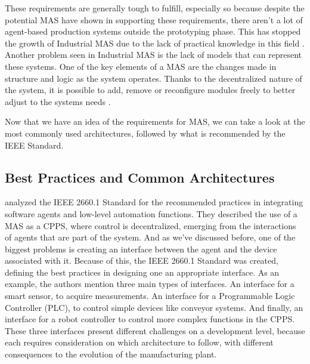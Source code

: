 These requirements are generally tough to fulfill, especially so because despite the potential MAS have shown in supporting these requirements, there aren't a lot of agent-based production systems outside the prototyping phase. This has stopped the growth of Industrial MAS due to the lack of practical knowledge in this field \cite{Karnouskos2019}. Another problem seen in Industrial MAS is the lack of models that can represent these systems. One of the key elements of a MAS are the changes made in structure and logic as the system operates. Thanks to the decentralized nature of the system, it is possible to add, remove or reconfigure modules freely to better adjust to the systems needs \cite{Karnouskos2019}.

Now that we have an idea of the requirements for MAS, we can take a look at the most commonly used architectures, followed by what is recommended by the IEEE Standard.

\subsection{Best Practices and Common Architectures}

\citeauthor{Leitao2021} \cite{Leitao2021} analyzed the IEEE 2660.1 Standard for the recommended practices in integrating software agents and low-level automation functions. They described the use of a MAS as a CPPS, where control is decentralized, emerging from the interactions of agents that are part of the system. And as we've discussed before, one of the biggest problems is creating an interface between the agent and the device associated with it. Because of this, the IEEE 2660.1 Standard was created, defining the best practices in designing one an appropriate interface.
As an example, the authors mention three main types of interfaces. An interface for a smart sensor, to acquire measurements. An interface for a Programmable Logic Controller (PLC), to control simple devices like conveyor systems. And finally, an interface for a robot controller to control more complex functions in the CPPS. These three interfaces present different challenges on a development level, because each requires consideration on which architecture to follow, with different consequences to the evolution of the manufacturing plant.

